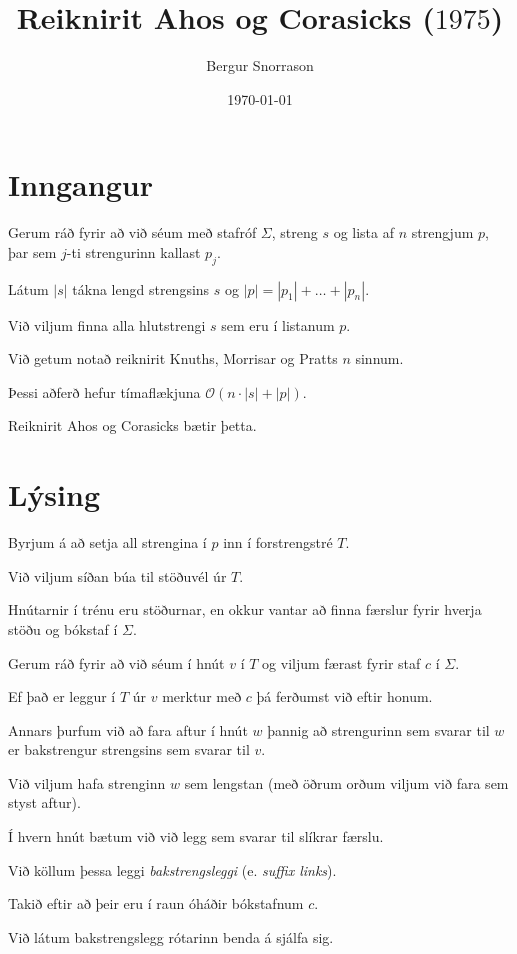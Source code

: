 \title{Reiknirit Ahos og Corasicks ($1975$)}
\author{Bergur Snorrason}
\date{\today}



\frame{\titlepage}

\section{Inngangur}
{
    {
        \item<1-> Gerum ráð fyrir að við séum með stafróf $\Sigma$, streng $s$ og lista af $n$ strengjum $p$, þar sem $j$-ti strengurinn kallast $p_j$.
        \item<2-> Látum $|s|$ tákna lengd strengsins $s$ og $|p| = |p_1| + \dots + |p_n|$.
        \item<3-> Við viljum finna alla hlutstrengi $s$ sem eru í listanum $p$.
        \item<4-> Við getum notað reiknirit Knuths, Morrisar og Pratts $n$ sinnum.
        \item<5-> Þessi aðferð hefur tímaflækjuna $\mathcal{O}(n \cdot |s| + |p|)$.
        \item<6-> Reiknirit Ahos og Corasicks bætir þetta.
    }
}

\section{Lýsing}
{
    {
        \item<1-> Byrjum á að setja all strengina í $p$ inn í forstrengstré $T$.
        \item<2-> Við viljum síðan búa til stöðuvél úr $T$.
        \item<3-> Hnútarnir í trénu eru stöðurnar, en okkur vantar að finna færslur fyrir hverja stöðu og bókstaf í $\Sigma$.
        \item<4-> Gerum ráð fyrir að við séum í hnút $v$ í $T$ og viljum færast fyrir staf $c$ í $\Sigma$.
        \item<5-> Ef það er leggur í $T$ úr $v$ merktur með $c$ þá ferðumst við eftir honum.
        \item<6-> Annars þurfum við að fara aftur í hnút $w$ þannig að strengurinn sem svarar til $w$ er bakstrengur strengsins sem svarar til $v$.
        \item<7-> Við viljum hafa strenginn $w$ sem lengstan (með öðrum orðum viljum við fara sem styst aftur).
        \item<8-> Í hvern hnút bætum við við legg sem svarar til slíkrar færslu.
        \item<9-> Við köllum þessa leggi \emph{bakstrengsleggi} (e. \emph{suffix links}).
        \item<10-> Takið eftir að þeir eru í raun óháðir bókstafnum $c$.
        \item<11-> Við látum bakstrengslegg rótarinn benda á sjálfa sig.
    }
}

